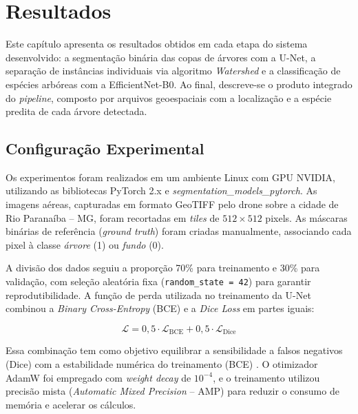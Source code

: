 
\chapter{Resultados}\label{sec:resultados}

Este capítulo apresenta os resultados obtidos em cada etapa do sistema desenvolvido: a segmentação binária das copas de árvores com a U-Net, a separação de instâncias individuais via algoritmo \textit{Watershed} e a classificação de espécies arbóreas com a EfficientNet-B0. Ao final, descreve-se o produto integrado do \textit{pipeline}, composto por arquivos geoespaciais com a localização e a espécie predita de cada árvore detectada.

\section{Configuração Experimental}\label{sec:config_exp}

Os experimentos foram realizados em um ambiente Linux com GPU NVIDIA, utilizando as bibliotecas PyTorch 2.x e \textit{segmentation\_models\_pytorch}. As imagens aéreas, capturadas em formato GeoTIFF pelo drone sobre a cidade de Rio Paranaíba -- MG, foram recortadas em \textit{tiles} de $512 \times 512$ pixels. As máscaras binárias de referência (\textit{ground truth}) foram criadas manualmente, associando cada pixel à classe \textit{árvore} (1) ou \textit{fundo} (0).

A divisão dos dados seguiu a proporção 70\% para treinamento e 30\% para validação, com seleção aleatória fixa (\texttt{random\_state = 42}) para garantir reprodutibilidade. A função de perda utilizada no treinamento da U-Net combinou a \textit{Binary Cross-Entropy} (BCE) e a \textit{Dice Loss} em partes iguais:

\begin{equation}
    \mathcal{L} = 0{,}5 \cdot \mathcal{L}_{\text{BCE}} + 0{,}5 \cdot \mathcal{L}_{\text{Dice}}
    \label{eq:loss}
\end{equation}

Essa combinação tem como objetivo equilibrar a sensibilidade a falsos negativos (Dice) com a estabilidade numérica do treinamento (BCE) \cite{jadon2020survey}. O otimizador AdamW foi empregado com \textit{weight decay} de $10^{-4}$, e o treinamento utilizou precisão mista (\textit{Automatic Mixed Precision} -- AMP) para reduzir o consumo de memória e acelerar os cálculos.

